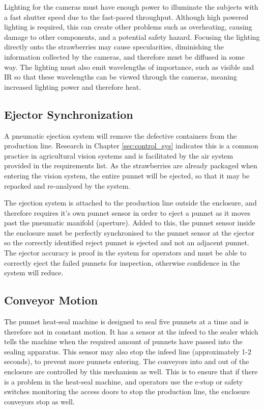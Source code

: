 \documentclass[fleqn,twoside,12pt]{report}
\begin{document}
Lighting for the cameras must have enough power to illuminate the subjects with a fast shutter speed due to the fast-paced throughput. Although high powered lighting is required, this can create other problems such as overheating, causing damage to other components, and a potential safety hazard. Focusing the lighting directly onto the strawberries may cause specularities, diminishing the information collected by the cameras, and therefore must be diffused in some way. The lighting must also emit wavelengths of importance, such as visible and IR so that these wavelengths can be viewed through the cameras, meaning increased lighting power and therefore heat.



\subsection{Ejector Synchronization}

A pneumatic ejection system will remove the defective containers from the production line. Research in Chapter \ref{sec:control_sys} indicates this is a common practice in agricultural vision systems and is facilitated by the air system provided in the requirements list. As the strawberries are already packaged when entering the vision system, the entire punnet will be ejected, so that it may be repacked and re-analysed by the system.

The ejection system is attached to the production line outside the enclosure, and therefore requires it's own punnet sensor in order to eject a punnet as it moves past the pneumatic manifold (aperture). Added to this, the punnet sensor inside the enclosure must be perfectly synchronised to the punnet sensor at the ejector so the correctly identified reject punnet is ejected and not an adjacent punnet. The ejector accuracy is proof in the system for operators and must be able to correctly eject the failed punnets for inspection, otherwise confidence in the system will reduce.


\subsection{Conveyor Motion}

The punnet heat-seal machine is designed to seal five punnets at a time and is therefore not in constant motion. It has a sensor at the infeed to the sealer which tells the machine when the required amount of punnets have passed into the sealing apparatus. This sensor may also stop the infeed line (approximately 1-2 seconds), to prevent more punnets entering. The conveyors into and out of the enclosure are controlled by this mechanism as well. This is to ensure that if there is a problem in the heat-seal machine, and operators use the e-stop or safety switches monitoring the access doors to stop the production line, the enclosure conveyors stop as well.
\end{document}
